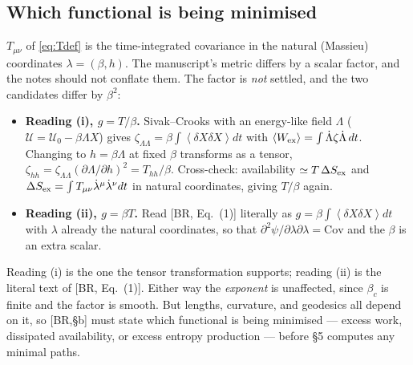 \documentclass[11pt,a4paper]{article}
\newcommand{\avg}[1]{\left\langle #1 \right\rangle}
\newcommand{\Uc}{\mathscr{U}}          %
\newcommand{\Tm}{T}
\newcommand{\avg}[1]{\left\langle #1 \right\rangle}
\begin{document}
\subsection{Which functional is being minimised}
\label{sec:objective}
$\Tm_{\mu\nu}$ of \eqref{eq:Tdef} is the time-integrated covariance in the natural
(Massieu) coordinates $\lambda=(\beta,h)$. The manuscript's metric differs by a scalar
factor, and the notes should not conflate them. The factor is \emph{not} settled, and the
two candidates differ by $\beta^2$:
\begin{itemize}
  \item \textbf{Reading (i), $g=\Tm/\beta$.} Sivak--Crooks with an energy-like field
        $\Lambda$ ($\Uc=\Uc_0-\beta\Lambda X$) gives
        $\zeta_{\Lambda\Lambda}=\beta\!\int\!\avg{\delta X\delta X}dt$ with
        $\avg{W_{\rm ex}}=\int\dot\Lambda\zeta\dot\Lambda\,dt$. Changing to $h=\beta\Lambda$
        at fixed $\beta$ transforms as a tensor,
        $\zeta_{hh}=\zeta_{\Lambda\Lambda}(\partial\Lambda/\partial h)^2=\Tm_{hh}/\beta$.
        Cross-check: availability $\simeq T\,\Delta S_{\rm ex}$ and
        $\Delta S_{\rm ex}=\int\Tm_{\mu\nu}\dot\lambda^\mu\dot\lambda^\nu dt$ in natural
        coordinates, giving $\Tm/\beta$ again.
  \item \textbf{Reading (ii), $g=\beta\Tm$.} Read [BR, Eq.~(1)] literally as
        $g=\beta\!\int\!\avg{\delta X\delta X}dt$ with $\lambda$ already the natural
        coordinates, so that $\partial^2\psi/\partial\lambda\partial\lambda=\mathrm{Cov}$ and
        the $\beta$ is an extra scalar.
\end{itemize}
Reading (i) is the one the tensor transformation supports; reading (ii) is the literal text
of [BR, Eq.~(1)]. Either way the \emph{exponent} is unaffected, since $\beta_c$ is finite
and the factor is smooth. But lengths, curvature, and geodesics all depend on it, so
[BR,\S b] must state which functional is being minimised --- excess work, dissipated
availability, or excess entropy production --- before \S5 computes any minimal paths.
\end{document}
